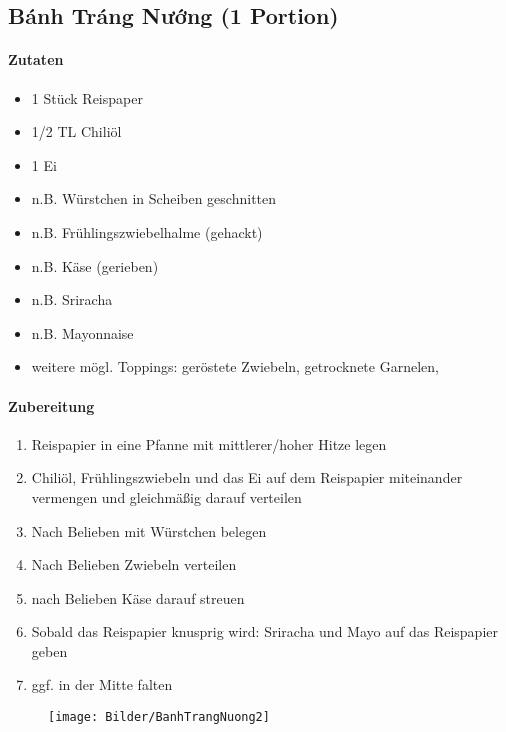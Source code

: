 \newpage
{}
\subsection{Bánh Tráng Nướng (1 Portion)} 
\paragraph{Zutaten}
\begin{itemize}[noitemsep]
	\item 1 Stück Reispaper
	\item 1/2 TL Chiliöl
	\item 1 Ei
	\item n.B. Würstchen in Scheiben geschnitten
	\item n.B. Frühlingszwiebelhalme (gehackt)
	\item n.B. Käse (gerieben) 
	\item n.B. Sriracha 
	\item n.B. Mayonnaise 
	\item weitere mögl. Toppings: geröstete Zwiebeln, getrocknete Garnelen, 
\end{itemize}
\paragraph{Zubereitung}
\begin{enumerate}[noitemsep]
	\item Reispapier in eine Pfanne mit mittlerer/hoher Hitze legen
	\item Chiliöl, Frühlingszwiebeln und das Ei auf dem Reispapier miteinander vermengen und gleichmäßig darauf verteilen  
	\item Nach Belieben mit Würstchen belegen 
	\item Nach Belieben Zwiebeln verteilen
	\item nach Belieben Käse darauf streuen
	\item Sobald das Reispapier knusprig wird: Sriracha und Mayo auf das Reispapier geben
	\item ggf. in der Mitte falten
\end{enumerate}
\begin{figure}[h]
\centering
\texttt{[image: Bilder/BanhTrangNuong2]}
\end{figure}
